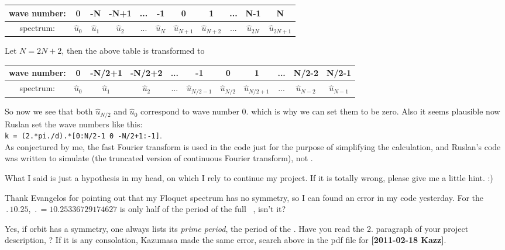 \begin{description}
\begin{tabular}{c || c | c | c | c | c | c | c | c | c | c }
\hline
 wave number:& 0 & -N & -N+1 & ... & -1 & 0 & 1 & ... & N-1  & N \\ \hline
 spectrum:   & $\hat{u}_{0}$ & $\hat{u}_{1}$ & $\hat{u}_{2}$ & ... &
 $\hat{u}_{N}$ & $\hat{u}_{N+1}$ & $\hat{u}_{N+2}$ & ... & $\hat{u}_{2N}$ & $\hat{u}_{2N+1}$ \\
\hline
 \end{tabular}

 Let $N=2N+2$, then the above table is transformed to

\begin{tabular}{c || c | c | c | c | c | c | c | c | c | c }
\hline
 wave number:& 0 & -N/2+1 & -N/2+2 & ... & -1 & 0 & 1 & ... & N/2-2  & N/2-1 \\ \hline
 spectrum:   & $\hat{u}_{0}$ & $\hat{u}_{1}$ & $\hat{u}_{2}$ & ... & $\hat{u}_{N/2-1}$ &
 $\hat{u}_{N/2}$ & $\hat{u}_{N/2+1}$ & ... & $\hat{u}_{N-2}$ & $\hat{u}_{N-1}$ \\
\hline
 \end{tabular}


So now we see that both $\hat{u}_{N/2}$ and $\hat{u}_{0}$ correspond
to wave number $0$. which is
why we can set them to be zero. Also it seems plausible now
Ruslan set the wave numbers like this: \\
\texttt{k = (2.*pi./d).*[0:N/2-1 0 -N/2+1:-1]}.\\
As conjectured by me, the fast Fourier transform is used in the code just
for the purpose of simplifying the
calculation, and Ruslan's code was written to simulate 
(the truncated version of
continuous Fourier transform), not .

What I said is just a hypothesis in my head, on which I rely to continue my project. If it is
totally wrong, please give me a little hint. :)

\item[2013-08-01 Xiong Ding] Thank Evangelos for pointing out that
my Floquet spectrum has no symmetry, so I can found an error in
my code yesterday. For the \po\ $\period{10.25}$,
$\period{}=10.25336729174627$ is
only half of the period of the full \statesp\ \po, isn't it?

\item[2013-08-02 Predrag to Xiong] Yes, if orbit has a symmetry, one
always lists its \emph{prime period}, the period of the \rpo. Have you
read the 2. paragraph of your project description,
? If it is any consolation, Kazumasa made the
same error, search  above in the pdf file for {\bf [2011-02-18 Kazz]}.


\end{description}
